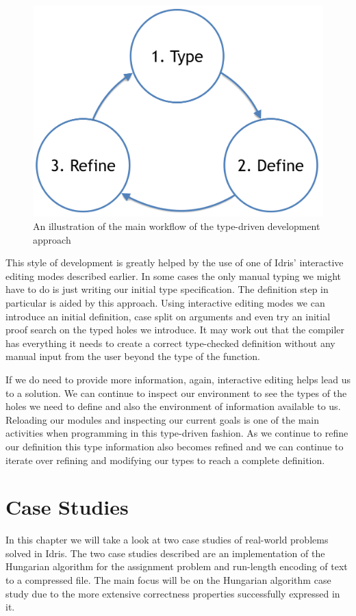 \documentclass[a4paper, notitlepage]{report}
\begin{document}
\begin{figure}[H]
\centering
\includegraphics[width=0.8\linewidth]{./fig/tdd_cycle.png}
\caption{An illustration of the main workflow of the type-driven development approach}
\end{figure}

This style of development is greatly helped by the use of one of Idris'
interactive editing modes described earlier. In some cases the only manual
typing we might have to do is just writing our initial type specification. The
definition step in particular is aided by this approach. Using interactive
editing modes we can introduce an initial definition, case split on arguments
and even try an initial proof search on the typed holes we introduce. It may
work out that the compiler has everything it needs to create a correct
type-checked definition without any manual input from the user beyond the type
of the function.

If we do need to provide more information, again, interactive editing helps lead
us to a solution. We can continue to inspect our environment to see the types of
the holes we need to define and also the environment of information available to
us. Reloading our modules and inspecting our current goals is one of the main
activities when programming in this type-driven fashion. As we continue to
refine our definition this type information also becomes refined and we can
continue to iterate over refining and modifying our types to reach a complete
definition.
\chapter{Case Studies}
\label{sec:org2b985fc}
In this chapter we will take a look at two case studies of real-world problems
solved in Idris. The two case studies described are an implementation of the
Hungarian algorithm for the assignment problem and run-length encoding of text
to a compressed file. The main focus will be on the Hungarian algorithm case
study due to the more extensive correctness properties successfully expressed in
it.
\end{document}
